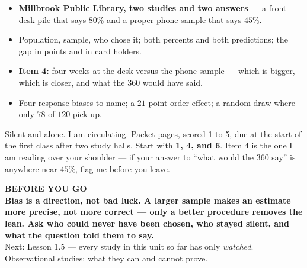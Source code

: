 \documentclass[aspectratio=169, 11pt]{beamer}
\begin{document}
\begin{frame}[t, plain]
  \begin{itemize}\setlength{\itemsep}{5pt}
    \item \textbf{Millbrook Public Library, two studies and two answers} --- a front-desk pile
          that says $80\%$ and a proper phone sample that says $45\%$.
    \item Population, sample, who chose it; both percents and both predictions; the gap in
          points and in card holders.
    \item \textbf{Item 4:} four weeks at the desk versus the phone sample --- which is bigger,
          which is closer, and what the $360$ would have said.
    \item Four response biases to name; a $21$-point order effect; a random draw where only $78$
          of $120$ pick up.
  \end{itemize}
  \begin{block}{Silent and alone. I am circulating. Packet pages, scored 1 to 5, due at the start of the first class after two study halls.}
    Start with \textbf{1, 4, and 6}. Item 4 is the one I am reading over your shoulder --- if
    your answer to ``what would the $360$ say'' is anywhere near $45\%$, flag me before you
    leave.
  \end{block}
\end{frame}

{
\begin{frame}[plain]
  \vspace{1.5cm}\hspace{0.8cm}%
  \begin{minipage}{0.86\textwidth}
    {\color{goldacc}\bfseries\small BEFORE YOU GO}\\[0.7cm]
    {\color{white}\bfseries\Large Bias is a direction, not bad luck. A larger sample makes an
    estimate more precise, not more correct --- only a better procedure removes the lean. Ask
    who could never have been chosen, who stayed silent, and what the question told them to
    say.}\\[0.9cm]
    {\color{frostmid}\small Next: Lesson 1.5 --- every study in this unit so far has only
    \emph{watched}. Observational studies: what they can and cannot prove.}
  \end{minipage}
\end{frame}
}
\end{document}
